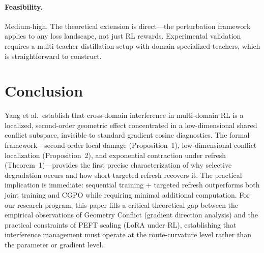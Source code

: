 \documentclass[11pt,a4paper]{article}
\begin{document}
\paragraph{Feasibility.} Medium-high. The theoretical extension is direct---the perturbation framework applies to any loss landscape, not just RL rewards. Experimental validation requires a multi-teacher distillation setup with domain-specialized teachers, which is straightforward to construct.

\section{Conclusion}

Yang et al.\ establish that cross-domain interference in multi-domain RL is a localized, second-order geometric effect concentrated in a low-dimensional shared conflict subspace, invisible to standard gradient cosine diagnostics. The formal framework---second-order local damage (Proposition~1), low-dimensional conflict localization (Proposition~2), and exponential contraction under refresh (Theorem~1)---provides the first precise characterization of why selective degradation occurs and how short targeted refresh recovers it. The practical implication is immediate: sequential training + targeted refresh outperforms both joint training and CGPO while requiring minimal additional computation. For our research program, this paper fills a critical theoretical gap between the empirical observations of Geometry Conflict (gradient direction analysis) and the practical constraints of PEFT scaling (LoRA under RL), establishing that interference management must operate at the route-curvature level rather than the parameter or gradient level.
\end{document}
